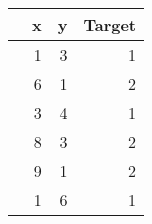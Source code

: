 \begin{tabular}{rrrr}
\toprule
  & x & y & Target  \\
\midrule
 & 1  & 3  & 1     \\
 & 6  & 1  & 2     \\
 & 3  & 4  & 1      \\
 & 8  & 3  & 2     \\
 & 9  & 1  & 2     \\
 & 1  & 6  & 1 	\\     
\bottomrule
\end{tabular}
